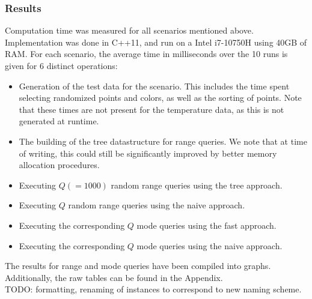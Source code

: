 \documentclass{article}
\begin{document}
\subsubsection*{Results}
Computation time was measured for all scenarios mentioned above. Implementation was done in C++11, and run on a Intel i7-10750H using 40GB of RAM. For each scenario, the average time in milliseconds over the 10 runs is given for 6 distinct operations:
\begin{itemize}
    \item Generation of the test data for the scenario. This includes the time spent
          selecting randomized points and colors, as well as the sorting of points. Note
          that these times are not present for the temperature data, as this is not
          generated at runtime.
    \item The building of the tree datastructure for range queries. We note that at time
          of writing, this could still be significantly improved by better memory
          allocation procedures.
    \item Executing $Q (= 1000)$ random range queries using the tree approach.
    \item Executing $Q$ random range queries using the naive approach.
    \item Executing the corresponding $Q$ mode queries using the fast approach.
    \item Executing the corresponding $Q$ mode queries using the naive approach.
\end{itemize}
The results for range and mode queries have been compiled into graphs. Additionally, the raw tables can be found in the Appendix.\\
TODO: formatting, renaming of instances to correspond to new naming scheme.


\end{document}
